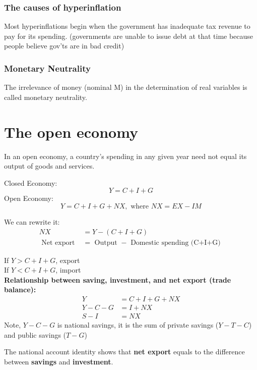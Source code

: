 \documentclass[12pt]{article}
\begin{document}
\subsubsection{The causes of hyperinflation}
Most hyperinflations begin when the government has inadequate tax revenue to pay
for its spending. (governments are unable to issue debt at that time because people
believe gov'ts are in bad credit)


\subsubsection{Monetary Neutrality}
The irrelevance of money (nominal M) in the determination of real variables is called
monetary neutrality.



\section{The open economy}
In an open economy, a country’s spending in any given year need not equal its output 
of goods and services.

Closed Economy:
\begin{equation*}
Y = C + I + G
\end{equation*}
Open Economy:
\begin{equation*}
Y = C + I + G + NX, \text{ where } NX = EX - IM
\end{equation*}

We can rewrite it:
\begin{align*}
NX &= Y - (C + I + G)\\
\text{ Net export } &= \text{ Output } - \text{ Domestic spending (C+I+G) }
\end{align*}

If $ Y>C + I + G $, export\\
If $ Y<C + I + G $, import\\

{\textbf {Relationship between saving, investment, and net export (trade balance):}}
\begin{align*}
Y &= C + I + G + NX\\
Y - C - G &= I + NX\\
S - I &= NX
\end{align*}
Note, $ Y - C - G $ is national savings, it is the sum of private savings ($ Y - T - C
$) and public savings ($ T - G $)

The national account identity shows that {\textbf {net export}} equals to the
difference between {\textbf {savings}} and {\textbf {investment}}.
\end{document}
